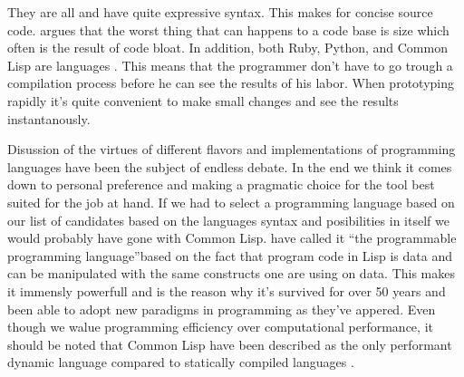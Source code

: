 They are all %
and have quite expressive syntax. This makes for concise source code.
\citet{yegge07} argues that the worst thing that can happens to a code base is
size which often is the result of code bloat. In addition, both Ruby, Python,
and Common Lisp are  languages%
.
This means that the programmer don't have to go trough a compilation process
before he can see the results of his labor. When prototyping rapidly it's
quite convenient to make small changes and see the results instantanously.

Disussion of the virtues of different flavors and implementations of
programming languages have been the subject of endless debate.
In the end we think it comes down to
personal preference and making a pragmatic choice for the tool best suited for
the job at hand. If we had to select a programming language based on our list
of candidates based on the languages syntax and posibilities in itself we
would probably have gone with Common Lisp. \citet[p.~27]{foderaro91} have
called it ``the programmable programming language''based on the fact that
program code in Lisp is data and can be manipulated with the same constructs
one are using on data. This makes it immensly powerfull and is the reason why
it's survived for over 50 years \citep[p.~217]{mccarthy78}
and been able to adopt new paradigms in programming as they've appered.
Even though we walue programming efficiency over computational performance,
it should be noted that Common Lisp have been described as the only performant
dynamic language \citep{martin08} compared to statically compiled languages%
.

